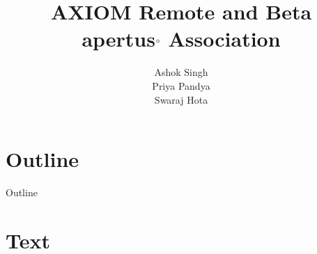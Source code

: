 \documentclass{beamer}
\title{AXIOM Remote and Beta \\  
apertus$\degree$ Association} %
\author{Ashok Singh \\
Priya Pandya \\
Swaraj Hota}
\date{}
\begin{document}
{ 
\frame{\titlepage}}


\section*{Outline}\begin{frame}{Outline}\tableofcontents\end{frame}

\section{Text}
\end{document}
